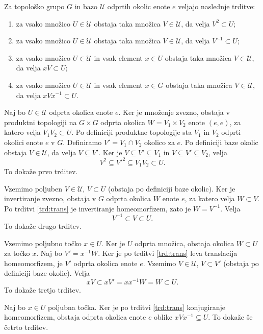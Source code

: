 \documentclass[mat1]{fmfdelo}
\newcommand{\Ucurl}{\mathcal{U}}
\begin{document}
\begin{trditev}\label{trd:okolice}
Za topološko grupo $G$ in bazo $\Ucurl$ odprtih okolic enote $e$ veljajo naslednje trditve:
\begin{enumerate}
\item za vsako množico $U \in \Ucurl$ obstaja taka množica $V \in \Ucurl$, da velja $V^{2} \subset U$;
\item za vsako množico $U \in \Ucurl$ obstaja taka množica $V \in \Ucurl$, da velja $V^{-1} \subset U$;
\item za vsako množico $U \in \Ucurl$ in vsak element $x \in U$ obstaja taka množica $V \in \Ucurl$, da velja $xV \subset U$;
\item za vsako množico $U \in \Ucurl$ in vsak element $x \in G$ obstaja taka množica $V \in \Ucurl$, da velja $xVx^{-1} \subset U$.
\end{enumerate}
\end{trditev}

\begin{dokaz}
Naj bo $U \in \Ucurl$  odprta okolica enote $e$. Ker je množenje zvezno, obstaja v produktni topologiji na $G \times G$ odprta okolica $W = V_1 \times V_2$ enote $(e, e)$, za katero velja $V_1V_2 \subset U$. Po definiciji produktne topologije sta $V_1$ in $V_2$ odprti okolici enote $e$ v $G$. Definiramo $V' = V_1 \cap V_2$ okolico za $e$. Po definiciji baze okolic obstaja $V \in \Ucurl$, da velja $V \subseteq V'$. Ker je $V \subseteq V' \subseteq V_1$ in $V \subseteq V' \subseteq V_2$, velja \[V^2 \subseteq V'^2 \subseteq V_1V_2 \subset U.\] To dokaže prvo trditev.

Vzemimo poljuben $V \in \Ucurl$, $V \subset U$ (obstaja po definiciji baze okolic). Ker je invertiranje zvezno, obstaja v $G$ odprta okolica $W$ enote $e$, za katero velja $W \subset V$. Po trditvi \ref{trd:trans} je invertiranje homeomorfizem, zato je $W = V^{-1}$. Velja \[V^{-1} \subset V \subset U.\] To dokaže drugo trditev.

Vzemimo poljubno točko $x \in U$. Ker je $U$ odprta množica, obstaja okolica $W \subset U$ za točko $x$. Naj bo $V' = x^{-1}W$. Ker je po trditvi \ref{trd:trans} leva translacija homeomorfizem, je $V'$ odprta okolica enote $e$. Vzemimo $V \in \Ucurl$, $V \subset V'$ (obstaja po definiciji baze okolic). Velja \[xV \subset xV' = xx^{-1}W = W \subset U.\]
To dokaže tretjo trditev.

Naj bo $x \in U$ poljubna točka. Ker je po trditvi \ref{trd:trans} konjugiranje homeomorfizem, obstaja odprta okolica enote $e$ oblike $xVx^{-1} \subseteq U$.
To dokaže še četrto trditev.
\end{dokaz}
\end{document}
